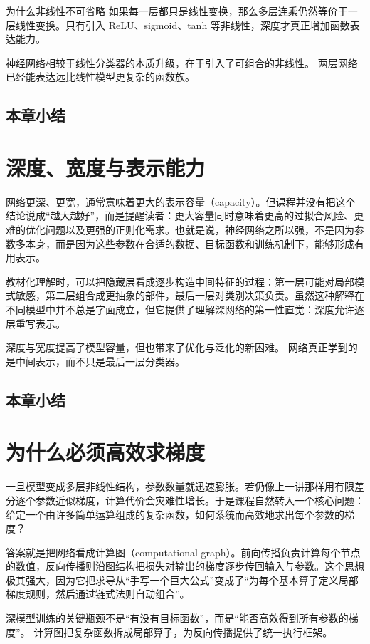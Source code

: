 \documentclass[a4paper]{article}
\begin{document}
\begin{knowledgebox}{为什么非线性不可省略}
如果每一层都只是线性变换，那么多层连乘仍然等价于一层线性变换。只有引入 ReLU、sigmoid、tanh 等非线性，深度才真正增加函数表达能力。
\end{knowledgebox}

神经网络相较于线性分类器的本质升级，在于引入了可组合的非线性。
两层网络已经能表达远比线性模型更复杂的函数族。
\subsection{本章小结}

\section{深度、宽度与表示能力}
网络更深、更宽，通常意味着更大的表示容量（capacity）。但课程并没有把这个结论说成“越大越好”，而是提醒读者：更大容量同时意味着更高的过拟合风险、更难的优化问题以及更强的正则化需求。也就是说，神经网络之所以强，不是因为参数多本身，而是因为这些参数在合适的数据、目标函数和训练机制下，能够形成有用表示。

教材化理解时，可以把隐藏层看成逐步构造中间特征的过程：第一层可能对局部模式敏感，第二层组合成更抽象的部件，最后一层对类别决策负责。虽然这种解释在不同模型中并不总是字面成立，但它提供了理解深网络的第一性直觉：深度允许逐层重写表示。

深度与宽度提高了模型容量，但也带来了优化与泛化的新困难。
网络真正学到的是中间表示，而不只是最后一层分类器。
\subsection{本章小结}

\section{为什么必须高效求梯度}
一旦模型变成多层非线性结构，参数数量就迅速膨胀。若仍像上一讲那样用有限差分逐个参数近似梯度，计算代价会灾难性增长。于是课程自然转入一个核心问题：给定一个由许多简单运算组成的复杂函数，如何系统而高效地求出每个参数的梯度？

答案就是把网络看成计算图（computational graph）。前向传播负责计算每个节点的数值，反向传播则沿图结构把损失对输出的梯度逐步传回输入与参数。这个思想极其强大，因为它把求导从“手写一个巨大公式”变成了“为每个基本算子定义局部梯度规则，然后通过链式法则自动组合”。

深模型训练的关键瓶颈不是“有没有目标函数”，而是“能否高效得到所有参数的梯度”。
计算图把复杂函数拆成局部算子，为反向传播提供了统一执行框架。
\end{document}
